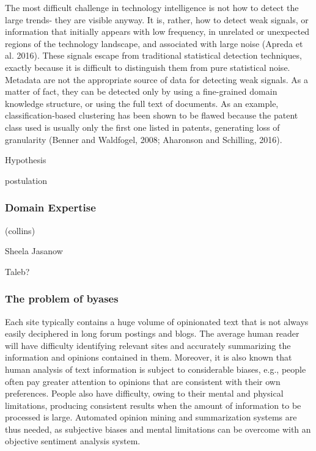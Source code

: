 \documentclass[]{book}
\begin{document}
The most difficult challenge in technology intelligence is not how to
detect the large trends- they are visible anyway. It is, rather, how to
detect weak signals, or information that initially appears with low
frequency, in unrelated or unexpected regions of the technology
landscape, and associated with large noise (Apreda et al. 2016). These
signals escape from traditional statistical detection techniques,
exactly because it is difficult to distinguish them from pure
statistical noise. Metadata are not the appropriate source of data for
detecting weak signals. As a matter of fact, they can be detected only
by using a fine-grained domain knowledge structure, or using the full
text of documents. As an example, classification-based clustering has
been shown to be flawed because the patent class used is usually only
the first one listed in patents, generating loss of granularity (Benner
and Waldfogel, 2008; Aharonson and Schilling, 2016).

Hypothesis

postulation

\subsubsection{Domain Expertise}\label{domain-expertise}

(collins)

Sheela Jasanow

Taleb?

\subsubsection{The problem of byases}\label{sotadocumentsunderstandbyas}

Each site typically contains a huge volume of opinionated text that is
not always easily deciphered in long forum postings and blogs. The
average human reader will have difficulty identifying relevant sites and
accurately summarizing the information and opinions contained in them.
Moreover, it is also known that human analysis of text information is
subject to considerable biases, e.g., people often pay greater attention
to opinions that are consistent with their own preferences. People also
have difficulty, owing to their mental and physical limitations,
producing consistent results when the amount of information to be
processed is large. Automated opinion mining and summarization systems
are thus needed, as subjective biases and mental limitations can be
overcome with an objective sentiment analysis system.
\end{document}
